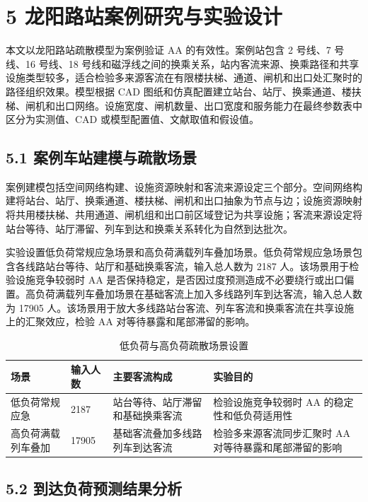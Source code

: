 \documentclass[UTF8,a4paper,12pt]{ctexart}
\begin{document}
\section{5 龙阳路站案例研究与实验设计}

本文以龙阳路站疏散模型为案例验证 AA 的有效性。案例站包含 2 号线、7 号线、16 号线、18 号线和磁浮线之间的换乘关系，站内客流来源、换乘路径和共享设施类型较多，适合检验多来源客流在有限楼扶梯、通道、闸机和出口处汇聚时的路径组织效果。模型根据 CAD 图纸和仿真配置建立站台、站厅、换乘通道、楼扶梯、闸机和出口网络。设施宽度、闸机数量、出口宽度和服务能力在最终参数表中区分为实测值、CAD 或模型配置值、文献取值和假设值。

\subsection{5.1 案例车站建模与疏散场景}

案例建模包括空间网络构建、设施资源映射和客流来源设定三个部分。空间网络构建将站台、站厅、换乘通道、楼扶梯、闸机和出口抽象为节点与边；设施资源映射将共用楼扶梯、共用通道、闸机组和出口前区域登记为共享设施；客流来源设定将站台等待、站厅滞留、列车到达和换乘关系转化为自然到达批次。

实验设置低负荷常规应急场景和高负荷满载列车叠加场景。低负荷常规应急场景包含各线路站台等待、站厅和基础换乘客流，输入总人数为 2187 人。该场景用于检验设施竞争较弱时 AA 是否保持稳定，是否因过度预测造成不必要绕行或出口偏置。高负荷满载列车叠加场景在基础客流上加入多线路列车到达客流，输入总人数为 17905 人。该场景用于放大多线路站台客流、列车客流和换乘客流在共享设施上的汇聚效应，检验 AA 对等待暴露和尾部滞留的影响。

\begin{table}[htbp]
\centering
\caption{低负荷与高负荷疏散场景设置}
\small
\begin{tabular}{p{}p{}p{}p{}}
\toprule
场景 & 输入人数 & 主要客流构成 & 实验目的 \\
\midrule
低负荷常规应急 & 2187 & 站台等待、站厅滞留和基础换乘客流 & 检验设施竞争较弱时 AA 的稳定性和低负荷适用性 \\
高负荷满载列车叠加 & 17905 & 基础客流叠加多线路列车到达客流 & 检验多来源客流同步汇聚时 AA 对等待暴露和尾部滞留的影响 \\
\bottomrule
\end{tabular}
\end{table}

\subsection{5.2 到达负荷预测结果分析}
\end{document}
